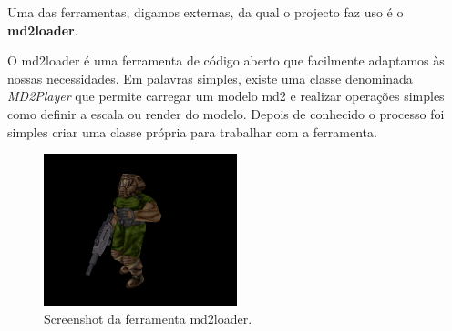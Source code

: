 

Uma das ferramentas, digamos externas, da qual o projecto faz uso é o {\bf md2loader}.

O md2loader é uma ferramenta de código aberto que facilmente adaptamos às nossas necessidades. Em palavras simples, existe uma classe denominada \textit{MD2Player} que permite carregar um modelo md2 e realizar operações simples como definir a escala ou render do modelo. Depois de conhecido o processo foi simples criar uma classe própria para trabalhar com a ferramenta.

\-

\begin{figure}[h]
\begin{center}
\includegraphics[width=0.5\textwidth]{images/md2loader.png}
\caption{Screenshot da ferramenta md2loader.}
\end{center}
\end{figure}



